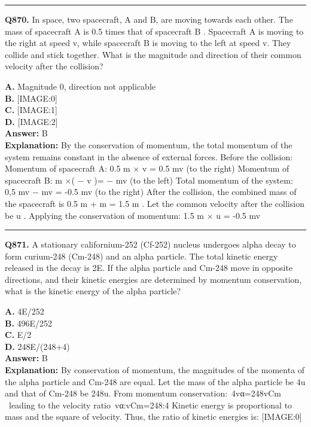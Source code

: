 \documentclass[12pt]{article}
\begin{document}
\hrule
\vspace{1em}


\noindent
\textbf{Q870.} In space, two spacecraft, A and B, are moving towards each other.
The mass of spacecraft A is 0.5 times that of spacecraft B
. Spacecraft A is moving to the right at speed v, while spacecraft B is moving to the left at speed v. They collide and stick together. What is the magnitude and direction of their common velocity after the collision?



\textbf{A.} Magnitude 0, direction not applicable \\
\textbf{B.} [IMAGE:0] \\
\textbf{C.} [IMAGE:1] \\
\textbf{D.} [IMAGE:2] \\

\textbf{Answer:} B \\
\textbf{Explanation:} By the conservation of momentum, the total momentum of the system remains constant in the absence of external forces. Before the collision:
\cdot 
Momentum of spacecraft A:
0.5
m
×
v
=
0.5
mv
(to the right)
\cdot 
Momentum of spacecraft B:
m
×(
−
v
)=
−
mv
(to the left)
Total momentum of the system:
0,5
mv
−
mv
=
-0.5
mv
(to the right)
After the collision, the combined mass of the spacecraft is
0.5
m
+
m
=
1.5
m
. Let the common velocity after the collision be
u
. Applying the conservation of momentum:
1.5
m
×
u
=
-0.5
mv

\hrule
\vspace{1em}


\noindent
\textbf{Q871.} A stationary californium-252 (Cf-252) nucleus undergoes alpha decay to form curium-248 (Cm-248) and an alpha particle. The total kinetic energy released in the decay is 2E. If the alpha particle and Cm-248 move in opposite directions, and their kinetic energies are determined by momentum conservation, what is the kinetic energy of the alpha particle?



\textbf{A.} 4E/252 \\
\textbf{B.} 496E/252 \\
\textbf{C.} E/2 \\
\textbf{D.} 248E/(248+4) \\

\textbf{Answer:} B \\
\textbf{Explanation:} By conservation of momentum, the magnitudes of the momenta of the alpha particle and Cm-248 are equal. Let the mass of the alpha particle be 4u and that of Cm-248 be 248u. From momentum conservation: 4vα=248vCm  leading to the velocity ratio vα:vCm=248:4 Kinetic energy is proportional to mass and the square of velocity. Thus, the ratio of kinetic energies is:
[IMAGE:0]
\end{document}
